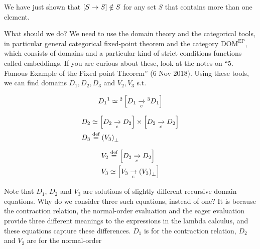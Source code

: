 \begin{enumcirc}
	We have just shown that $\left[ S \rightarrow S \right] \notin S$ for any set $S$
	that contains more than one element.
	\item
	What should we do?
	We need to use the domain theory and the categorical tools, in particular
	general categorical fixed-point theorem and the category
	$\textrm{DOM}^\textrm{EP}$, which consists of domains and a particular kind of
	strict conditions functions called embeddings.
	If you are curious about these, look at the notes on
	``5. Famous Example of the Fixed point Theorem'' (6 Nov 2018).
	Using these tools, we can find domains $D_1, D_2, D_3$ and $V_2, V_3$ s.t.
	\begin{enumrm}
		\item
		\[
			D_1\footnotemark \simeq\footnotemark \brackets{D_1 \toc\footnotemark D_1}
		\]
		\item
		\begin{align*}
			D_2 & \simeq \left[ D_2 \xrightarrow[c]{} D_2 \right] \times \left[ D_2 \xrightarrow[c]{} D_2 \right] \\
			D_3 & \stackrel{\text{def}}{=} \left( V_3 \right)_\bot                                       \\
		\end{align*}
		\item
		\begin{align*}
			V_2 & \stackrel{\text{def}}{=} \left[ D_2 \xrightarrow[c]{} D_2 \right]              \\
			V_3 & \simeq \left[ V_3 \xrightarrow[c]{} \left( V_3 \right)_\bot \right] \\
		\end{align*}
	\end{enumrm}
	\item
	Note that $D_1$, $D_2$ and $V_3$ are solutions of slightly different recursive
	domain equations.
	Why do we consider three such equations, instead of one?
	It is because the contraction relation, the normal-order evaluation and the
	eager evaluation provide three different meanings to the expressions in the
	lambda calculus,
	and these equations capture these differences.
	$D_1$ is for the contraction relation, $D_2$ and $V_2$ are for the normal-order

\end{enumcirc}
